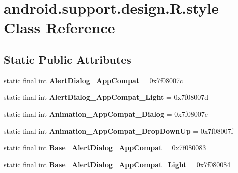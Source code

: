 \hypertarget{classandroid_1_1support_1_1design_1_1_r_1_1style}{}\section{android.\+support.\+design.\+R.\+style Class Reference}
\label{classandroid_1_1support_1_1design_1_1_r_1_1style}
\subsection*{Static Public Attributes}
\begin{DoxyCompactItemize}
\item 
\hypertarget{classandroid_1_1support_1_1design_1_1_r_1_1style_a18ec447211099976a5704ae5d237795a}{}static final int {\bfseries Alert\+Dialog\+\_\+\+App\+Compat} = 0x7f08007c\label{classandroid_1_1support_1_1design_1_1_r_1_1style_a18ec447211099976a5704ae5d237795a}

\item 
\hypertarget{classandroid_1_1support_1_1design_1_1_r_1_1style_a5fc28cfb8b777b79c8190cd259a037c1}{}static final int {\bfseries Alert\+Dialog\+\_\+\+App\+Compat\+\_\+\+Light} = 0x7f08007d\label{classandroid_1_1support_1_1design_1_1_r_1_1style_a5fc28cfb8b777b79c8190cd259a037c1}

\item 
\hypertarget{classandroid_1_1support_1_1design_1_1_r_1_1style_afc859831d6bcff267de3ceda0de4d65d}{}static final int {\bfseries Animation\+\_\+\+App\+Compat\+\_\+\+Dialog} = 0x7f08007e\label{classandroid_1_1support_1_1design_1_1_r_1_1style_afc859831d6bcff267de3ceda0de4d65d}

\item 
\hypertarget{classandroid_1_1support_1_1design_1_1_r_1_1style_ae65c69c112be812a18d7f16d15c8a099}{}static final int {\bfseries Animation\+\_\+\+App\+Compat\+\_\+\+Drop\+Down\+Up} = 0x7f08007f\label{classandroid_1_1support_1_1design_1_1_r_1_1style_ae65c69c112be812a18d7f16d15c8a099}

\item 
\hypertarget{classandroid_1_1support_1_1design_1_1_r_1_1style_a3478a35666043a8e87309030935f5a60}{}static final int {\bfseries Base\+\_\+\+Alert\+Dialog\+\_\+\+App\+Compat} = 0x7f080083\label{classandroid_1_1support_1_1design_1_1_r_1_1style_a3478a35666043a8e87309030935f5a60}

\item 
\hypertarget{classandroid_1_1support_1_1design_1_1_r_1_1style_ae0afd65daccda54e3d8a57251bbf0c38}{}static final int {\bfseries Base\+\_\+\+Alert\+Dialog\+\_\+\+App\+Compat\+\_\+\+Light} = 0x7f080084\label{classandroid_1_1support_1_1design_1_1_r_1_1style_ae0afd65daccda54e3d8a57251bbf0c38}


\end{DoxyCompactItemize}
